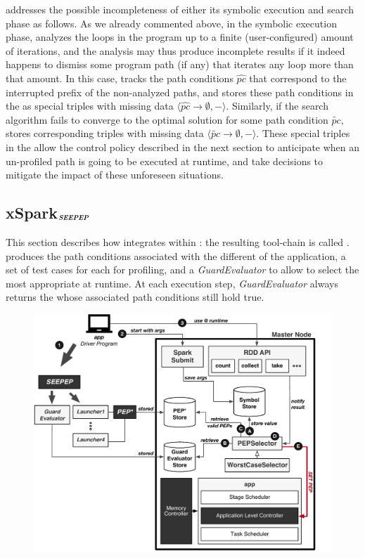 \approach addresses the possible incompleteness of either its symbolic execution and search phase as follows. As we already commented above, in the symbolic execution phase, \approach analyzes the loops in the program up to a finite (user-configured) amount of iterations, and the analysis may thus produce incomplete results if it indeed happens to dismiss some program path (if any) that iterates any loop more than that amount. In this case, \approach tracks the path conditions $\hat{pc}$ that correspond to the interrupted prefix of the non-analyzed paths, and stores these path conditions in the \model as special triples with missing data \(\langle \hat{pc} \rightarrow \emptyset, -\rangle\).  Similarly, if the search algorithm fails to converge to the optimal solution for some path condition $\tilde{pc}$, \approach stores corresponding triples with missing data \(\langle \tilde{pc} \rightarrow \emptyset, -\rangle\). These special triples in the \model allow the control policy described in the next section to anticipate when an un-profiled path is going to be executed at runtime, and take decisions to mitigate the impact of these unforeseen situations. 


\subsection{xSpark$_{\text{\textit{\textbf{SEEPEP}}}}$}
This section describes how \dSymb integrates within \cSpark: the resulting tool-chain is called \tool. \dSymb produces the 
path conditions associated with the different \plans of the application, a set of test cases for each \plan for profiling, and a \textit{GuardEvaluator} to allow \cSpark to select the most appropriate \plan at runtime. At each execution step, \textit{GuardEvaluator} always returns the \plans whose associated path conditions still hold true. 


\begin{figure}[tbhp]
	\centering
	\includegraphics[width=\columnwidth]{images/xsparksymb}
	\caption{\tool}
	\label{fig:xsparkdagsymb}
\end{figure}

